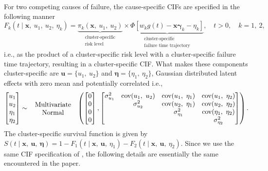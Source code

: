 For two competing causes of failure, the cause-specific CIFs are
specified in the following manner
\begin{equation}
 F_{k} (t \mid \bm{x},~u_{1},~u_{2},~\eta_{k}) =
 \underbrace{\pi_{k}(\bm{x},~u_{1},~u_{2})}_{
 \substack{\text{cluster-specific}\\\text{risk level}}}\times
  \underbrace{\Phi[w_{k} g(t) - \bm{x}\bm{\gamma}_{k} - \eta_{k}]}_{
   \substack{\text{cluster-specific}\\\text{failure time trajectory}}
  }, \quad t > 0, \quad k = 1,~2,
  \label{eq:cif}
\end{equation}
i.e., as the product of a cluster-specific risk level with a
cluster-specific failure time trajectory, resulting in a
cluster-specific CIF. What makes these components cluster-specific are
\(\bm{u} = \{u_{1},~u_{2}\}\) and \(\bm{\eta} =
\{\eta_{1},~\eta_{2}\}\), Gaussian distributed latent effects with zero
mean and potentially correlated i.e.,
\[
 \begin{bmatrix} u_{1}\\u_{2}\\\eta_{1}\\\eta_{2} \end{bmatrix} \sim
 \parbox{2.5cm}{\centering Multivariate Normal}
 \left(
  \begin{bmatrix} 0\\0\\0\\0\end{bmatrix},
  \begin{bmatrix}
   \sigma_{u_{1}}^{2}&
   \text{cov}(u_{1},~u_{2})&
   \text{cov}(u_{1},~\eta_{1})&\text{cov}(u_{1},~\eta_{2})\\
   &\sigma_{u_{2}}^{2}&
   \text{cov}(u_{2},~\eta_{1})&\text{cov}(u_{2},~\eta_{2})\\
   &&\sigma_{\eta_{1}}^{2}&\text{cov}(\eta_{1},~\eta_{2})\\
   &&&\sigma_{\eta_{2}}^{2}
  \end{bmatrix}
 \right).
\]
The cluster-specific survival function is given by \(S(t \mid
\bm{x},~\bm{u},~\bm{\eta}) = 1 - F_{1} (t \mid
\bm{x},~\bm{u},~\eta_{1}) - F_{2} (t \mid
\bm{x},~\bm{u},~\eta_{2})\). Since we use the same CIF specification
of , the following details are essentially the same
encountered in the paper.

